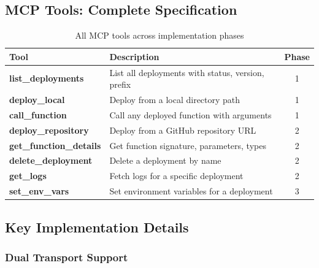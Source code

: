 \documentclass[12pt, a4paper]{article}
\begin{document}
\subsection{MCP Tools: Complete Specification}

\begin{table}[H]
\centering
{}
\begin{tabularx}{\textwidth}{>{\ttfamily\bfseries\footnotesize}p{3.4cm} X c}
  \toprule
  \rowcolor{mcblue!15}
  \textbf{Tool} & \textbf{Description} & \textbf{Phase} \\
  \midrule
  list\_deployments &
    List all deployments with status, version, prefix & 1 \\
  deploy\_local &
    Deploy from a local directory path & 1 \\
  call\_function &
    Call any deployed function with arguments & 1 \\
  deploy\_repository &
    Deploy from a GitHub repository URL & 2 \\
  get\_function\_details &
    Get function signature, parameters, types & 2 \\
  delete\_deployment &
    Delete a deployment by name & 2 \\
  get\_logs &
    Fetch logs for a specific deployment & 2 \\
  set\_env\_vars &
    Set environment variables for a deployment & 3 \\
  \bottomrule
\end{tabularx}
\caption{All MCP tools across implementation phases}
\end{table}

\subsection{Key Implementation Details}

\subsubsection{Dual Transport Support}
\end{document}
